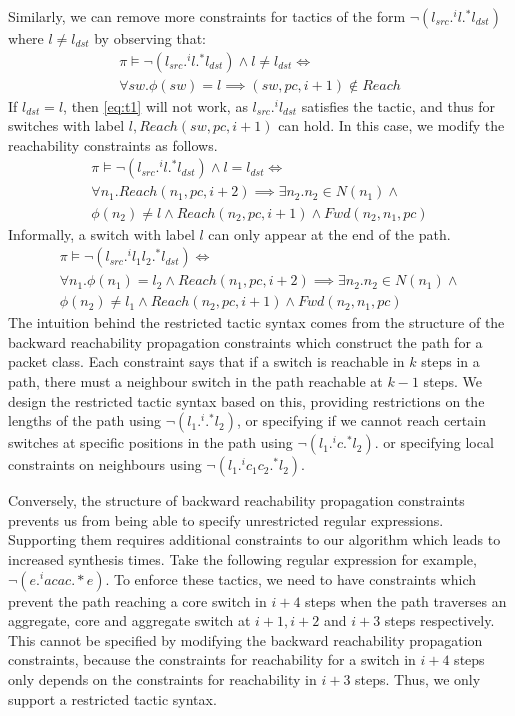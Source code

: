 Similarly, we can remove more constraints for tactics
of the form $\neg (l_{src}  .^i l .^* l_{dst})$ where $l \not= l_{dst}$ by observing that:
\begin{multline} \label{eq:t1}
\pi \vDash \neg (l_{src} .^i l .^* l_{dst}) \wedge l \not= l_{dst} \Leftrightarrow \\ \forall sw. \phi(sw) = l \implies (sw, pc, i + 1) \notin Reach
\end{multline}
If $l_{dst} = l$, then \cref{eq:t1} will not work, as $l_{src} .^i l_{dst}$ 
satisfies the tactic, and thus for switches with label $l,Reach(sw,pc,i+1)$ can hold.
In this case, we modify the reachability constraints 
as follows.
\begin{multline} \label{eq:t2}
 \pi \vDash \neg (l_{src} .^i l .^* l_{dst}) \wedge l = l_{dst} \Leftrightarrow \\ 
 \forall n_1. Reach(n_1,pc,i + 2) \implies \exists n_2.  n_2 \in N(n_1) \wedge \\ \phi(n_2) \not= l \wedge 
 Reach(n_2,pc,i+1) \wedge Fwd(n_2,n_1,pc)
\end{multline}
Informally, a switch with label $l$ can only appear at the end of the path.
\begin{multline} \label{eq:t3}
\pi \vDash \neg (l_{src} .^i l_1 l_2 .^* l_{dst}) \Leftrightarrow \\ 
\forall n_1. \phi(n_1) = l_2 \wedge Reach(n_1,pc,i + 2) \implies \exists n_2.  n_2 \in N(n_1) \wedge \\ \phi(n_2) \not= l_1 \wedge 
Reach(n_2,pc,i+1) \wedge Fwd(n_2,n_1,pc)
\end{multline}
The intuition behind the restricted tactic syntax comes from the structure of the backward reachability propagation 
constraints which construct the path for a packet class. Each constraint says that if a switch is reachable in $k$ steps in a path,
 there must a neighbour switch in the path reachable at $k-1$ steps. We design the restricted tactic syntax based
  on this, providing restrictions on the lengths of the path using $\neg (l_1 .^i .^* l_2)$, or specifying if we cannot 
  reach certain switches at specific positions in the path using  $\neg (l_1 .^i c .^* l_2)$. or specifying local 
  constraints on neighbours using $\neg (l_1  .^i c_1 c_2 .^* l_2)$.  
  
  Conversely, the structure of backward reachability propagation constraints 
  prevents us from being able to specify unrestricted regular expressions. Supporting them
  requires additional constraints to our algorithm which leads to increased synthesis times. 
  Take the following regular expression for example, $\neg(e .^i a c a c .*e)$. To enforce
  these tactics, we need to have constraints which prevent the path reaching a core switch in $i+4$
  steps when the path traverses an aggregate, core and aggregate switch at $i+1, i+2$ and $i+3$ steps
  respectively. This cannot be specified by modifying the backward reachability propagation 
  constraints, because the constraints for reachability for a switch in $i + 4$ steps only depends on 
  the constraints for  reachability in $i+3$ steps. Thus, we only support a restricted tactic syntax.   

